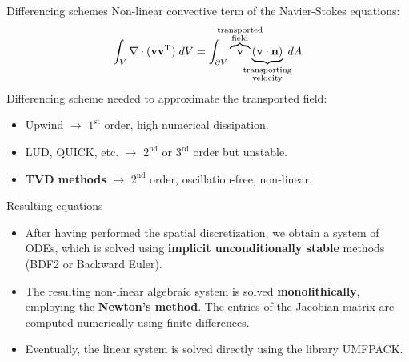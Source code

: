 \documentclass{beamer}
\begin{document}
\begin{frame}{Differencing schemes}
Non-linear convective term of the Navier-Stokes equations:
\begin{equation*}
\int_V \nabla \cdot (\mathbf{v} \mathbf{v}^\mathrm{T}) \; dV = \int_{\partial 
V} 
\overbrace{\mathbf{v}}^{\substack{\text{\makebox[0pt]{transported}} 
		\\ \text{\makebox[0pt]{field}}}} \underbrace{(\mathbf{v} \cdot 
	\mathbf{n})}_{\substack{\text{\makebox[0pt]{transporting}} \\
		\text{\makebox[0pt]{velocity}}}} \; dA
\end{equation*}
Differencing scheme needed to approximate the transported field:
\begin{itemize}
	\item Upwind $\rightarrow$ $1^\text{st}$ order, high numerical dissipation.
	\item LUD, QUICK, etc. $\rightarrow$ $2^\text{nd}$ or $3^\text{rd}$ order 
	but unstable.
	\item \textbf{TVD methods} $\rightarrow$ $2^\text{nd}$ order, 
	oscillation-free, non-linear.
\end{itemize}
\end{frame}
\begin{frame}{Resulting equations}
\begin{itemize}
\item After having performed the spatial discretization, we obtain a system of 
ODEs, which is solved using \textbf{implicit unconditionally stable} methods 
(BDF2 or Backward Euler).
\vspace{0.5cm}

\item The resulting non-linear algebraic system is solved 
\textbf{monolithically}, 
employing the \textbf{Newton's method}. The entries of the Jacobian matrix are 
computed numerically using finite differences.
\vspace{0.5cm}

\item Eventually, the linear system is solved directly using the library 
UMFPACK.
\end{itemize}
\end{frame}
\end{document}
